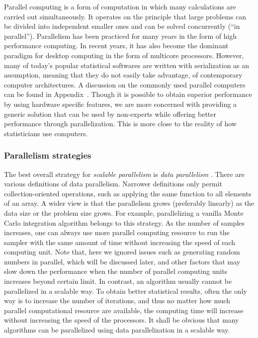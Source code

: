 Parallel computing is a form of computation in which many calculations are
carried out simultaneously. It operates on the principle that large problems
can be divided into independent smaller ones and can be solved concurrently
(``in parallel''). Parallelism has been practiced for many years in the form
of high performance computing. In recent years, it has also become the
dominant paradigm for desktop computing in the form of multicore processors.
However, many of today's popular statistical softwares are written with
serialization as an assumption, meaning that they do not easily take
advantage, of contemporary computer architectures. A discussion on the
commonly used parallel computers can be found in Appendix~. Though it is possible to obtain superior performance
by using hardware specific features, we are more concerned with providing a
generic solution that can be used by non-experts while offering better
performance through parallelization. This is more close to the reality of how
statisticians use computers.

\subsubsection{Parallelism strategies}
\label{ssub:Parallelism strategies}

The best overall strategy for \emph{scalable parallelism} is \emph{data
  parallelism} \cite{datapar}. There are various definitions of data
parallelism. Narrower definitions only permit collection-oriented operations,
such as applying the same function to all elements of an array. A wider view
is that the parallelism grows (preferably linearly) as the data size or the
problem size grows. For example, parallelizing a vanilla Monte Carlo
integration algorithm belongs to this strategy. As the number of samples
increases, one can always use more parallel computing resource to run the
sampler with the same amount of time without increasing the speed of each
computing unit. Note that, here we ignored issues such as generating random
numbers in parallel, which will be discussed later, and other factors that may
slow down the performance when the number of parallel computing units
increases beyond certain limit. In contrast, an \mcmc algorithm usually cannot
be parallelized in a scalable way. To obtain better statistical results, often
the only way is to increase the number of iterations, and thus no matter how
much parallel computational resource are available, the computing time will
increase without increasing the speed of the processors. It shall be obvious
that many \smc algorithms can be parallelized using data parallelization in a
scalable way.

